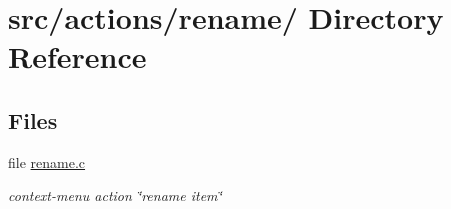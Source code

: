 \hypertarget{dir_000038}{
\section{src/actions/rename/ Directory Reference}
\label{dir_000038}
}
\subsection*{Files}
\begin{CompactItemize}
\item 
file \hyperlink{rename_8c}{rename.c}
\begin{CompactList}\small\item\em context-menu action \char`\"{}rename item\char`\"{} \item\end{CompactList}

\end{CompactItemize}
